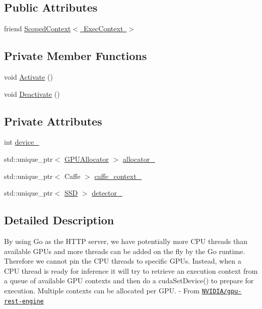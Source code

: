 \subsection*{Public Attributes}
\begin{DoxyCompactItemize}
\item 
friend \mbox{\hyperlink{class_exec_context_a5d1035fff84318aecd7d6b30c34c66f5}{Scoped\+Context$<$ Exec\+Context $>$}}
\end{DoxyCompactItemize}
\subsection*{Private Member Functions}
\begin{DoxyCompactItemize}
\item 
void \mbox{\hyperlink{class_exec_context_aad6945417b4a10d9ed0d338d16a1f105}{Activate}} ()
\item 
void \mbox{\hyperlink{class_exec_context_a91a52dd30a857c8e71ea98976a9d44c2}{Deactivate}} ()
\end{DoxyCompactItemize}
\subsection*{Private Attributes}
\begin{DoxyCompactItemize}
\item 
int \mbox{\hyperlink{class_exec_context_a05d01fbf5236f59519a9708580c175da}{device\+\_\+}}
\item 
std\+::unique\+\_\+ptr$<$ \mbox{\hyperlink{class_g_p_u_allocator}{G\+P\+U\+Allocator}} $>$ \mbox{\hyperlink{class_exec_context_aa91ffaae541ca563b5aabb2f2a1c53b5}{allocator\+\_\+}}
\item 
std\+::unique\+\_\+ptr$<$ Caffe $>$ \mbox{\hyperlink{class_exec_context_a6561f67a969e8b38001d488e4937515f}{caffe\+\_\+context\+\_\+}}
\item 
std\+::unique\+\_\+ptr$<$ \mbox{\hyperlink{class_s_s_d}{S\+SD}} $>$ \mbox{\hyperlink{class_exec_context_acfecd6b6e282a7b7c67451dedd8bacae}{detector\+\_\+}}
\end{DoxyCompactItemize}


\subsection{Detailed Description}
By using Go as the H\+T\+TP server, we have potentially more C\+PU threads than available G\+P\+Us and more threads can be added on the fly by the Go runtime. Therefore we cannot pin the C\+PU threads to specific G\+P\+Us. Instead, when a C\+PU thread is ready for inference it will try to retrieve an execution context from a queue of available G\+PU contexts and then do a cuda\+Set\+Device() to prepare for execution. Multiple contexts can be allocated per G\+PU. -\/ From \href{https://github.com/NVIDIA/gpu-rest-engine}{\tt N\+V\+I\+D\+I\+A/gpu-\/rest-\/engine}


